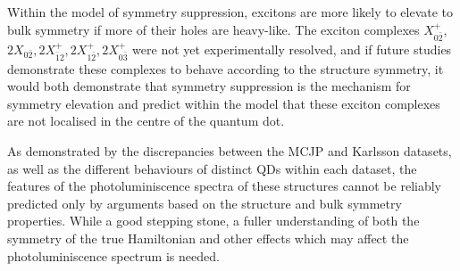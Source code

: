 Within the model of symmetry suppression, excitons are more likely to elevate to bulk symmetry if more of their holes are heavy-like. The exciton complexes $X^+_{0\bar{2}}$, $2X_{0\bar{2}}, 2X^+_{\bar{1}2}, 2X^+_{1\bar{2}}, 2X^+_{0\bar{3}}$ were not yet experimentally resolved, and if future studies demonstrate these complexes to behave according to the structure symmetry, it would both demonstrate that symmetry suppression is the mechanism for symmetry elevation and predict within the model that these exciton complexes are not localised in the centre of the quantum dot.

As demonstrated by the discrepancies between the MCJP and Karlsson datasets, as well as the different behaviours of distinct QDs within each dataset, the features of the photoluminiscence spectra of these structures cannot be reliably predicted only by arguments based on the structure and bulk symmetry properties. While a good stepping stone, a fuller understanding of both the symmetry of the true Hamiltonian and other effects which may affect the photoluminiscence spectrum is needed.
